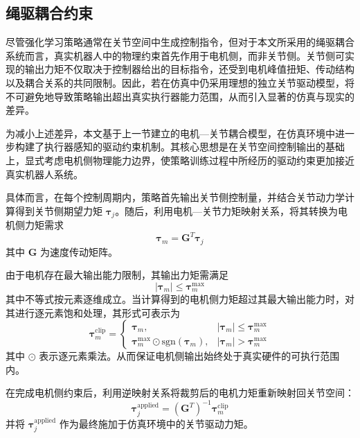 \subsection{绳驱耦合约束}

尽管强化学习策略通常在关节空间中生成控制指令，但对于本文所采用的绳驱耦合系统而言，真实机器人中的物理约束首先作用于电机侧，而非关节侧。关节侧可实现的输出力矩不仅取决于控制器给出的目标指令，还受到电机峰值扭矩、传动结构以及耦合关系的共同限制。因此，若在仿真中仍采用理想的独立关节驱动模型，将不可避免地导致策略输出超出真实执行器能力范围，从而引入显著的仿真与现实的差异。

为减小上述差异，本文基于上一节建立的电机—关节耦合模型，在仿真环境中进一步构建了执行器感知的驱动约束机制。其核心思想是在关节空间控制输出的基础上，显式考虑电机侧物理能力边界，使策略训练过程中所经历的驱动约束更加接近真实机器人系统。

具体而言，在每个控制周期内，策略首先输出关节侧控制量，并结合关节动力学计算得到关节侧期望力矩 $\boldsymbol{\tau}_j$。随后，利用电机—关节力矩映射关系，将其转换为电机侧力矩需求
\begin{equation}
	\boldsymbol{\tau}_m = \mathbf G^T \boldsymbol{\tau}_j
	\label{eq:motor_tau_from_joint}
\end{equation}
其中 $\mathbf G$ 为速度传动矩阵。

由于电机存在最大输出能力限制，其输出力矩需满足
\begin{equation}
	|\boldsymbol{\tau}_m| \le \boldsymbol{\tau}_m^{\max}
\end{equation}
其中不等式按元素逐维成立。当计算得到的电机侧力矩超过其最大输出能力时，对其进行逐元素饱和处理，其形式可表示为
\begin{equation}
	\boldsymbol{\tau}_m^{\mathrm{clip}} =
	\begin{cases}
		\boldsymbol{\tau}_m, & |\boldsymbol{\tau}_m| \le \boldsymbol{\tau}_m^{\max} \\
		\boldsymbol{\tau}_m^{\max} \odot \mathrm{sgn}(\boldsymbol{\tau}_m), & |\boldsymbol{\tau}_m| > \boldsymbol{\tau}_m^{\max}
	\end{cases}
\end{equation}
其中 $\odot$ 表示逐元素乘法。从而保证电机侧输出始终处于真实硬件的可执行范围内。

在完成电机侧约束后，利用逆映射关系将裁剪后的电机力矩重新映射回关节空间：
\begin{equation}
	\boldsymbol{\tau}_j^{\mathrm{applied}} = (\mathbf G^T)^{-1} \boldsymbol{\tau}_m^{\mathrm{clip}}
	\label{eq:joint_tau_applied}
\end{equation}
并将 $\boldsymbol{\tau}_j^{\mathrm{applied}}$ 作为最终施加于仿真环境中的关节驱动力矩。

